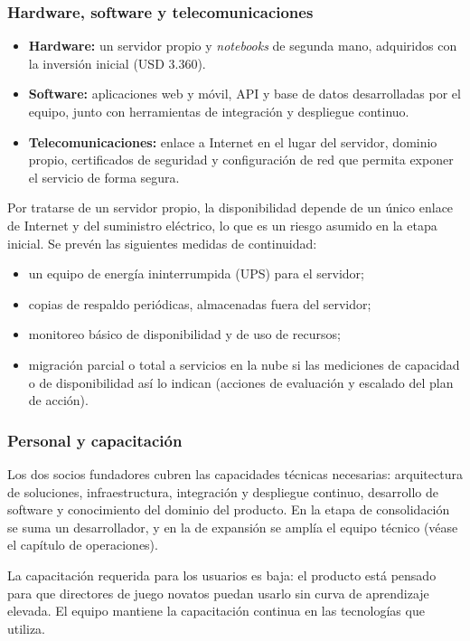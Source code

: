 \subsubsection{Hardware, software y telecomunicaciones}
\begin{itemize}
  \item \textbf{Hardware:} un servidor propio y \textit{notebooks} de segunda mano, adquiridos con la inversión inicial (USD 3.360).
  \item \textbf{Software:} aplicaciones web y móvil, API y base de datos desarrolladas por el equipo, junto con herramientas de integración y despliegue continuo.
  \item \textbf{Telecomunicaciones:} enlace a Internet en el lugar del servidor, dominio propio, certificados de seguridad y configuración de red que permita exponer el servicio de forma segura.
\end{itemize}
Por tratarse de un servidor propio, la disponibilidad depende de un único enlace de Internet y del suministro eléctrico, lo que es un riesgo asumido en la etapa inicial. Se prevén las siguientes medidas de continuidad:
\begin{itemize}
  \item un equipo de energía ininterrumpida (UPS) para el servidor;
  \item copias de respaldo periódicas, almacenadas fuera del servidor;
  \item monitoreo básico de disponibilidad y de uso de recursos;
  \item migración parcial o total a servicios en la nube si las mediciones de capacidad o de disponibilidad así lo indican (acciones de evaluación y escalado del plan de acción).
\end{itemize}

\subsubsection{Personal y capacitación}
Los dos socios fundadores cubren las capacidades técnicas necesarias: arquitectura de soluciones, infraestructura, integración y despliegue continuo, desarrollo de software y conocimiento del dominio del producto. En la etapa de consolidación se suma un desarrollador, y en la de expansión se amplía el equipo técnico (véase el capítulo de operaciones).

La capacitación requerida para los usuarios es baja: el producto está pensado para que directores de juego novatos puedan usarlo sin curva de aprendizaje elevada. El equipo mantiene la capacitación continua en las tecnologías que utiliza.

